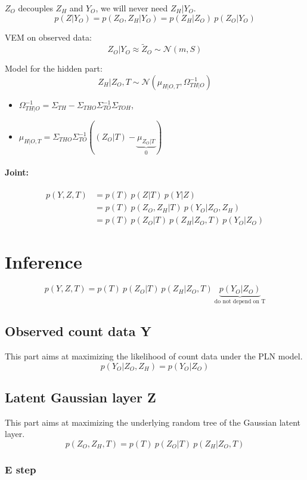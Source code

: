 \documentclass[11pt,a4paper]{article}
\begin{document}
$Z_O$ decouples $Z_H$ and $Y_O$, we will never need $Z_H|Y_O$.
$$ p(Z|Y_O) = p(Z_O,Z_H | Y_O) = p(Z_H|Z_O) \: p(Z_O|Y_O) $$


VEM on observed data: $$Z_O|Y_O \approx \widetilde{Z}_O \sim \mathcal{N}(m,S)$$

Model for the hidden part: $$Z_H|Z_O,T \sim \mathcal{N}(\mu_{H|O,T}, \Omega_{TH|O}^{-1})$$ 

\begin{itemize}
\item $\Omega_{TH|O}^{-1} = \Sigma_{TH} -\Sigma_{THO}\Sigma_{TO}^{-1}\Sigma_{TOH}$, 

\item $\mu_{H|O,T} = \Sigma_{THO}\Sigma_{TO}^{-1}((Z_O|T)-\underbrace{\mu_{Z_O|T}}_{0})$ \\
 
\end{itemize}

\paragraph{Joint:}
\begin{align*}
p(Y,Z,T)& = p(T) \: p(Z|T) \: p(Y|Z) \\
&= p(T)\: p(Z_O,Z_H|T) \: p(Y_O|Z_O,Z_H) \\
&= p(T) \: p(Z_O|T) \: p(Z_H | Z_O,T)  \: p(Y_O|Z_O)
\end{align*} 

\section{Inference}
$$p(Y,Z,T)= p(T) \: p(Z_O|T) \: p(Z_H | Z_O,T)  \: \underbrace{p(Y_O|Z_O)}_{\text{do not depend on T}}$$
\subsection{Observed count data Y}
This part aims at maximizing the likelihood of count data under the PLN model. 
$$p(Y_O|Z_O,Z_H) = p(Y_O|Z_O)$$
\subsection{Latent Gaussian layer Z}
This part aims at maximizing the underlying random tree of the Gaussian latent layer.
$$p(Z_O,Z_H,T) = p(T) \: p(Z_O|T) \: p(Z_H | Z_O,T)$$
\subsubsection{E step}
\end{document}
